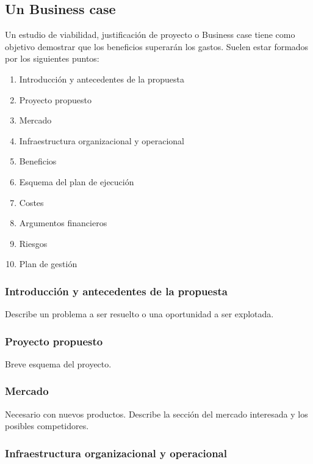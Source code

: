 \documentclass[12pt]{article}
\begin{document}
\subsection{Un Business case}
\label{2.2.0}

{Un estudio de viabilidad, justificación de proyecto o Business case tiene como objetivo demostrar que los beneficios superarán los gastos. Suelen estar formados por los siguientes puntos:}

\begin{enumerate}
    \item {Introducción y antecedentes de la propuesta}
    \item {Proyecto propuesto}
    \item {Mercado}
    \item {Infraestructura organizacional y operacional}
    \item {Beneficios}
    \item {Esquema del plan de ejecución}
    \item {Costes}
    \item {Argumentos financieros}
    \item {Riesgos}
    \item {Plan de gestión}
\end{enumerate}

\subsubsection{Introducción y antecedentes de la propuesta}
\label{2.2.1}

{Describe un problema a ser resuelto o una oportunidad a ser explotada.}

\subsubsection{Proyecto propuesto}
\label{2.2.2}

{Breve esquema del proyecto.}

\subsubsection{Mercado}
\label{2.2.3}

{Necesario con nuevos productos. Describe la sección del mercado interesada y los posibles competidores.}

\subsubsection{Infraestructura organizacional y operacional}
\label{2.2.4}
\end{document}
